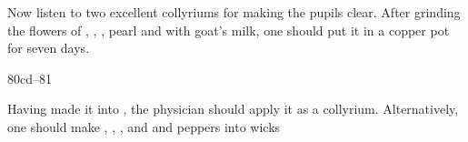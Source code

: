 \begin{translation}
    Now listen to two excellent collyriums for making the pupils clear.  
After grinding the flowers of ,
,  
, pearl and  with goat's milk, 
one should put it in a copper pot for seven days.

\item[80cd--81]

Having made it into , the physician should apply it as a collyrium.  
Alternatively, one should make 
, 
,
, and 
and peppers into wicks 




 



    

    
    
    
    \end{translation}
    
    
    
    